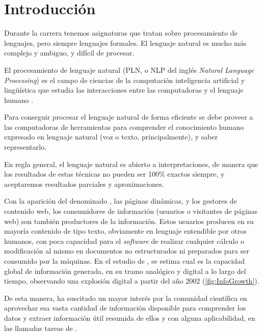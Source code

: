 
\chapter{Introducción}

Durante la carrera tenemos asignaturas que tratan sobre procesamiento de lenguajes, pero siempre lenguajes formales. El lenguaje natural es mucho más complejo y ambiguo, y difícil de procesar.


\begin{definition}[NLP]
El procesamiento de lenguaje natural (PLN, o NLP del inglés \emph{Natural Language Processing}) es el campo de ciencias de la computación inteligencia artificial y lingüística que estudia las interacciones entre las computadoras y el lenguaje humano \citep[Procesamiento de lenguajes naturales]{wikipedia-es}.
\end{definition}

Para conseguir procesar el lenguaje natural de forma eficiente se debe proveer a las computadoras de herramientas para comprender el conocimiento humano expresado en lenguaje natural (voz o texto, principalmente), y saber representarlo.

En regla general, el lenguaje natural es abierto a interpretaciones, de manera que los resultados de estas técnicas no pueden ser 100\% exactos siempre, y aceptaremos resultados parciales y aproximaciones.

Con la aparición del denominado , las páginas dinámicas, y los gestores de contenido web, los consumidores de información (usuarios o visitantes de páginas web) son también productores de la información. Estos usuarios producen en su mayoría contenido de tipo texto, obviamente en lenguaje entendible por otros humanos, con poca capacidad para el \emph{software} de realizar cualquier cálculo o modificación al mismo en documentos no estructurados ni preparados para ser consumido por la máquinas. En el estudio de \cite{Hilbert2011}, se estima cual es la capacidad global de información generada, en su tramo analógico y digital a lo largo del tiempo, observando una explosión digital a partir del año 2002 (\autoref{fig:InfoGrowth}).

De esta manera, ha suscitado un mayor interés por la comunidad científica en aprovechar esa vasta cantidad de información disponible para comprender los datos y extraer información útil resumida de ellos y con alguna aplicabilidad, en las llamadas tareas de .

